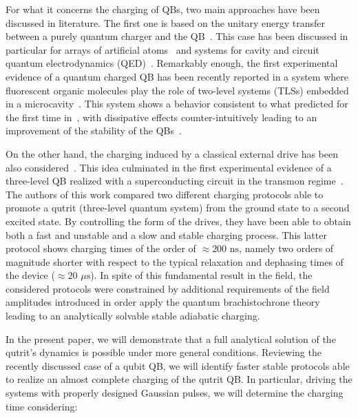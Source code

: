 \documentclass[12pt]{iopart}
\begin{document}
For what it concerns the charging of QBs, two main approaches have been discussed in literature. The first one is based on the unitary energy transfer between a purely quantum charger and the QB~\cite{Andolina18, Crescente22}. This case has been discussed in particular for arrays of artificial atoms~\cite{Campaioli17, Le18, Rossini20, Rosa20, Quach20, Gyhm22} and systems for cavity and
circuit quantum electrodynamics (QED)~\cite{Ferraro18, Crescente20b, Delmonte21, Dou21, Seah21, Shaghaghi22, Zhao22, Shaghaghi23, Gemme23, Erdman22, Rodriguez23}. Remarkably enough, the first experimental evidence of a quantum charged QB has been recently reported in a system where fluorescent organic molecules play the role of two-level systems (TLSs) embedded in a microcavity~\cite{Quach22}. This system shows a behavior consistent to what predicted for the first time in~\cite{Ferraro18}, with dissipative effects counter-intuitively leading to an improvement of the stability of the QBs~\cite{Dou21}. 

On the other hand, the charging induced by a classical external drive has been also considered~\cite{Zhang19, Crescente20}. This idea culminated in the first experimental evidence of a three-level QB realized with a superconducting circuit in the transmon regime~\cite{Hu22}. The authors of this work compared two different charging protocols able to promote a qutrit (three-level quantum system) from the ground state to a second excited state. By controlling the form of the drives, they have been able to obtain both a fast and unstable and a slow and stable charging process. This latter protocol shows charging times of the order of $\approx 200\,\,\mathrm{ns}$, namely two orders of magnitude shorter with respect to the typical relaxation and dephasing times of the device ($\approx 20\,\,\mu\mathrm{s}$). In spite of this fundamental result in the field, the considered protocols were constrained by additional requirements of the field amplitudes introduced in order apply the quantum brachistochrone theory~\cite{Santos19} leading to an analytically solvable stable adiabatic charging. 

In the present paper, we will demonstrate that a full analytical solution of the qutrit's dynamics is possible under more general conditions. Reviewing the recently discussed case of a qubit QB, we will identify faster stable protocols able to realize an almost complete charging of the qutrit QB. In particular, driving the systems with properly designed Gaussian pulses, we will determine the charging time considering:
\end{document}
